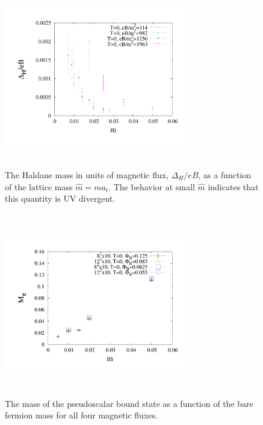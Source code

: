 \documentclass[aps,prd,twocolumn,showpacs,superscriptaddress,groupedaddress]{revtex4}  %
\begin{document}
\begin{figure}
 \includegraphics[height=8cm,width=8cm]{haldanediveB_vs_m_zeroT_graphene_paper.pdf} \hspace{-1cm}
\caption{The Haldane mass in units of magnetic flux, $\Delta_H/eB$, as a function of the lattice mass $\hat{m} = m a_t$. The behavior at small $\hat{m}$ indicates that
this quantity is UV divergent.}
\label{HaldanediveBvsm} 
\end{figure}

\begin{figure}
  \includegraphics[height=8cm,width=8cm]{ps_mt_vs_m_2exp_graphene_paper.pdf} \hspace{-1cm}
\caption{The mass of the pseudoscalar bound state as a function of the bare fermion mass for all four magnetic fluxes.}
\label{MPSvsm}
\end{figure}
\end{document}
